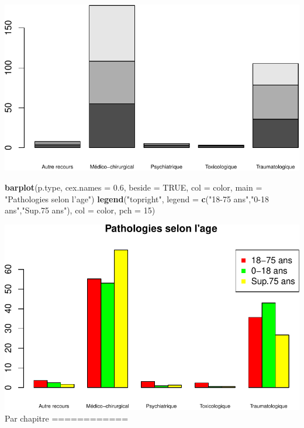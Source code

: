 \documentclass[]{article}
\newenvironment{Shaded}{\begin{snugshade}}{\end{snugshade}}
\newcommand{\KeywordTok}[1]{\textcolor[rgb]{0.13,0.29,0.53}{\textbf{{#1}}}}
\newcommand{\DataTypeTok}[1]{\textcolor[rgb]{0.13,0.29,0.53}{{#1}}}
\newcommand{\DecValTok}[1]{\textcolor[rgb]{0.00,0.00,0.81}{{#1}}}
\newcommand{\FloatTok}[1]{\textcolor[rgb]{0.00,0.00,0.81}{{#1}}}
\newcommand{\StringTok}[1]{\textcolor[rgb]{0.31,0.60,0.02}{{#1}}}
\newcommand{\OtherTok}[1]{\textcolor[rgb]{0.56,0.35,0.01}{{#1}}}
\newcommand{\NormalTok}[1]{{#1}}
\begin{document}
\includegraphics{analyse_merge_files/figure-latex/synthese-2.pdf}\\

\begin{Shaded}
\begin{Highlighting}[]
\KeywordTok{barplot}\NormalTok{(p.type, }\DataTypeTok{cex.names =} \FloatTok{0.6}\NormalTok{, }\DataTypeTok{beside =} \OtherTok{TRUE}\NormalTok{, }\DataTypeTok{col =} \NormalTok{color, }\DataTypeTok{main =} \StringTok{"Pathologies selon l'age"}\NormalTok{)}
\KeywordTok{legend}\NormalTok{(}\StringTok{"topright"}\NormalTok{, }\DataTypeTok{legend =} \KeywordTok{c}\NormalTok{(}\StringTok{"18-75 ans"}\NormalTok{,}\StringTok{"0-18 ans"}\NormalTok{,}\StringTok{"Sup.75 ans"}\NormalTok{), }\DataTypeTok{col =} \NormalTok{color, }\DataTypeTok{pch =} \DecValTok{15}\NormalTok{)}
\end{Highlighting}
\end{Shaded}

\includegraphics{analyse_merge_files/figure-latex/synthese-3.pdf}\\ Par
chapitre ============
\end{document}
